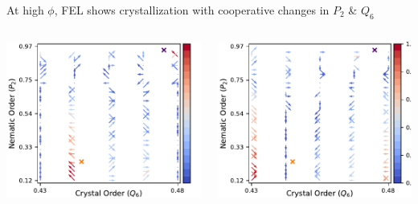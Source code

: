 \documentclass[aspectratio=169]{beamer}
\begin{document}
\begin{frame}[c]{At high $\phi$, FEL shows crystallization with cooperative changes in $P_{2}$ \& $Q_{6}$}

  \begin{columns}[T]

    \centering
    \includegraphics[width=\textwidth]{../figures/ch4_jcp/fig-quivers_10p25/fig-U_quiver_10p25.pdf}

    \centering
    \includegraphics[width=\textwidth]{../figures/ch4_jcp/fig-quivers_10p25/fig-mTS_quiver_10p25.pdf}

  \end{columns}

\end{frame}
\end{document}
